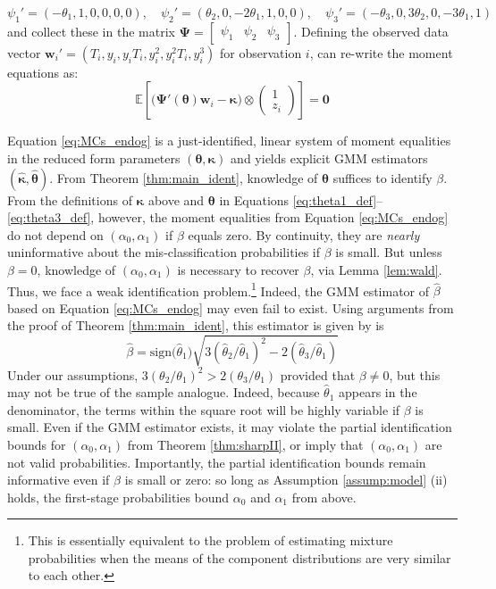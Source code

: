 \begin{equation}
  \psi_1' = (-\theta_1, 1, 0, 0, 0, 0), \quad
  \psi_2' = (\theta_2, 0, -2\theta_1, 1, 0, 0), \quad
  \psi_3' = (-\theta_3, 0, 3\theta_2, 0, -3\theta_1, 1)
  \label{eq:psi_def}
\end{equation}
and collect these in the matrix
$\boldsymbol{\Psi} = \left[
  \begin{array}{ccc}
    \psi_1 & \psi_2 & \psi_3
\end{array}\right]$.
Defining the observed data vector $\mathbf{w}_i' = (T_i, y_i, y_iT_i, y_i^2, y_i^2 T_i, y_i^3)$ for observation $i$, can re-write the moment equations as:
\begin{equation}
\mathbb{E}\left[
  \big(\boldsymbol{\Psi}'(\boldsymbol{\theta})\mathbf{w}_i - \boldsymbol{\kappa}\big) \otimes 
\left(
\begin{array}{c}
  1 \\ z_i
\end{array}\right)
\right] = \mathbf{0}
\label{eq:MCs_endog}
\end{equation}

Equation \ref{eq:MCs_endog} is a just-identified, linear system of moment equalities in the reduced form parameters $(\boldsymbol{\theta},\boldsymbol{\kappa})$ and yields explicit GMM estimators $(\widehat{\boldsymbol{\kappa}},\widehat{\boldsymbol{\theta}})$.
From Theorem \ref{thm:main_ident}, knowledge of $\boldsymbol{\theta}$ suffices to identify $\beta$.
From the definitions of $\boldsymbol{\kappa}$ above and $\boldsymbol{\theta}$  in Equations \ref{eq:theta1_def}--\ref{eq:theta3_def}, however, the moment equalities from Equation \ref{eq:MCs_endog} do not depend on $(\alpha_0, \alpha_1)$ if $\beta$ equals zero.
By continuity, they are \emph{nearly} uninformative about the mis-classification probabilities if $\beta$ is small.
But unless $\beta = 0$, knowledge of $(\alpha_0, \alpha_1)$ is necessary to recover $\beta$, via Lemma \ref{lem:wald}. 
Thus, we face a weak identification problem.\footnote{This is essentially equivalent to the problem of estimating mixture probabilities when the means of the component distributions are very similar to each other.}
Indeed, the GMM estimator of $\widehat{\beta}$ based on Equation \ref{eq:MCs_endog} may even fail to exist.
Using arguments from the proof of Theorem \ref{thm:main_ident}, this estimator is given by is
\[
  \widehat{\beta} = \mbox{sign}\big(\widehat{\theta}_1\big) \sqrt{3\left( \widehat{\theta}_2/\widehat{\theta}_1 \right)^2 - 2 \left(\widehat{\theta}_3/\widehat{\theta}_1 \right)}
\]
Under our assumptions, $3(\theta_2/\theta_1)^2 > 2 (\theta_3/\theta_1)$ provided that $\beta \neq 0$, but this may not be true of the sample analogue.
Indeed, because $\widehat{\theta}_1$ appears in the denominator, the terms within the square root will be highly variable if $\beta$ is small.
Even if the GMM estimator exists, it may violate the partial identification bounds for $(\alpha_0, \alpha_1)$ from Theorem \ref{thm:sharpII}, or imply that $(\alpha_0,\alpha_1)$ are not valid probabilities. 
Importantly, the partial identification bounds remain informative even if $\beta$ is small or zero: so long as Assumption \ref{assump:model} (ii) holds, the first-stage probabilities bound $\alpha_0$ and $\alpha_1$ from above.


